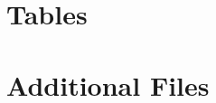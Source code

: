 \documentclass[twocolumn]{bmcart}%
\begin{document}
\begin{backmatter}
\section*{Tables}


\section*{Additional Files}



\end{backmatter}
\end{document}
